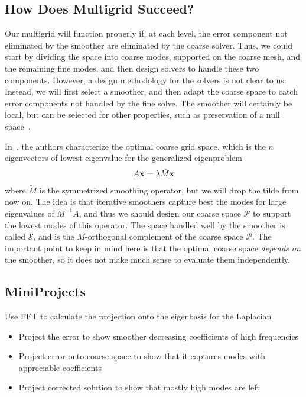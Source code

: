 \begin{refsection}
\chapter{How Does Multigrid Succeed?}\label{ch:success}

Our multigrid will function properly if, at each level, the error component not eliminated by the smoother are eliminated by the coarse solver. Thus, we could start by dividing the space into coarse modes, supported on the coarse mesh, and the remaining fine modes, and then design solvers to handle these two components. However, a design methodology for the solvers is not clear to us. Instead, we will first select a smoother, and then adapt the coarse space to catch error components not handled by the fine solve. The smoother will certainly be local, but can be selected for other properties, such as preservation of a null space~\parencite{FarrellMitchellWechsung2018,FarrellKnepleyWechsungMitchell2020}.

In~\parencite{BrannickEtAl2018}, the authors characterize the optimal coarse grid space, which is the $n$ eigenvectors of lowest eigenvalue for the generalized eigenproblem
\begin{align}
  A \vb{x} = \lambda \tilde M \vb{x}
\end{align}
where $\tilde M$ is the symmetrized smoothing operator, but we will drop the tilde from now on. The idea is that iterative smoothers capture best the modes for large eigenvalues of $M^{-1} A$, and thus we should design our coarse space $\mathcal{P}$ to support the lowest modes of this operator. The space handled well by the smoother is called $\mathcal{S}$, and is the $M$-orthogonal complement of the coarse space $\mathcal{P}$. The important point to keep in mind here is that the optimal coarse space \textit{depends on} the smoother, so it does not make much sense to evaluate them independently.

\section{MiniProjects}

Use FFT to calculate the projection onto the eigenbasis for the Laplacian
\begin{itemize}
  \item Project the error to show smoother decreasing coefficients of high frequencies
  \item Project error onto coarse space to show that it captures modes with appreciable coefficients
  \item Project corrected solution to show that mostly high modes are left
\end{itemize}


\end{refsection}
